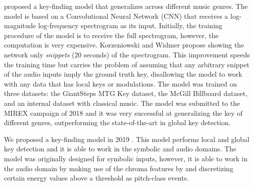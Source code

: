 


\textcite{korzeniowski2018genreagnostic} proposed a
key-finding model that generalizes across different music
genres. The model is based on a Convolutional Neural Network
(CNN) that receives a log-magnitude log-frequency
spectrogram as its input. Initially, the training procedure
of the model is to receive the full spectrogram, however,
the computation is very expensive. Korzeniowski and Widmer
propose showing the network only \emph{snippets} (20
seconds) of the spectrogram. This improvement speeds the
training time but carries the problem of assuming that any
arbitrary snippet of the audio inputs imply the ground truth
key, disallowing the model to work with any data that has
local keys or modulations. The model was trained on three
datasets: the GiantSteps MTG Key dataset, the McGill
Billboard dataset, and an internal dataset with classical
music. The model was submitted to the MIREX campaign of 2018
and it was very successful at generalizing the key of
different genres, outperforming the state-of-the-art in
global key detection.


We proposed a key-finding model in 2019
\parencite{napoleslopez2019keyfinding}. This model performs
local and global key detection and it is able to work in the
symbolic and audio domains. The model was originally
designed for symbolic inputs, however, it is able to work in
the audio domain by making use of the chroma features by
\textcite{mauch2010approximate} and discretizing certain
energy values above a threshold as pitch-class events.

